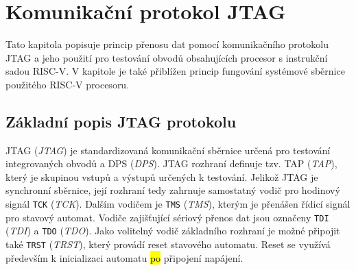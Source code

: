\chapter{Komunikační protokol JTAG}
Tato kapitola popisuje princip přenosu dat pomocí komunikačního protokolu JTAG a jeho použití pro testování obvodů obsahujících procesor s instrukční sadou \acs{RISC-V}. V kapitole je také přiblížen princip fungování systémové sběrnice použitého \acs{RISC-V} procesoru.

\section{Základní popis \acs{JTAG} protokolu}
\acs{JTAG} (\textit{\acl{JTAG}}) je standardizovaná komunikační sběrnice určená pro testování integrovaných obvodů a \acs{DPS} (\textit{\acl{DPS}}).
\acs{JTAG} rozhraní definuje tzv. \acs{TAP} (\textit{\acl{TAP}}), který je skupinou vstupů a výstupů určených k testování. Jelikož \acs{JTAG} je synchronní sběrnice, její rozhraní tedy zahrnuje samostatný vodič pro hodinový signál \texttt{\acs{TCK}} (\textit{\acl{TCK}}). Dalším vodičem je \texttt{\acs{TMS}} (\textit{\acl{TMS}}), kterým je přenášen řídicí signál pro stavový automat. Vodiče zajišťující sériový přenos dat jsou označeny \texttt{\acs{TDI}} (\textit{\acl{TDI}}) a \texttt{\acs{TDO}} (\textit{\acl{TDO}}). Jako volitelný vodič základního rozhraní je možné připojit také \texttt{\acs{TRST}} (\textit{\acl{TRST}}), který provádí reset stavového automatu. Reset se využívá především k inicializaci automatu \hl{po} připojení napájení. \cite {IEEE_1149-1} \cite{JTAG}

